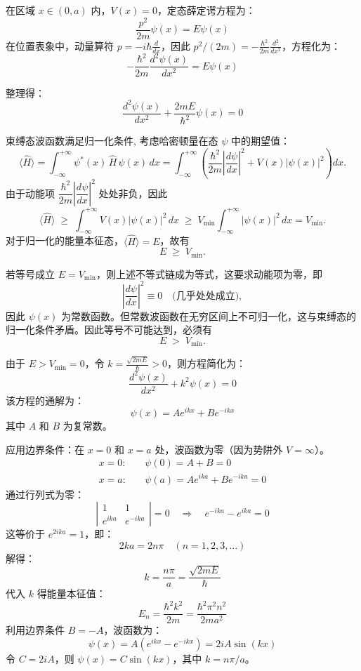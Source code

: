 在区域 $x \in (0, a)$ 内，$V(x) = 0$，定态薛定谔方程为：
\[
\frac{p^2}{2m} \psi(x) = E \psi(x)
\]
在位置表象中，动量算符 $p = -i\hbar \frac{d}{dx}$，因此 $p^2/(2m) = -\frac{\hbar^2}{2m} \frac{d^2}{dx^2}$，方程化为：
\[
-\frac{\hbar^2}{2m} \frac{d^2 \psi(x)}{dx^2} = E \psi(x)
\]

整理得：
\[
\frac{d^2 \psi(x)}{dx^2} + \frac{2mE}{\hbar^2} \psi(x) = 0
\]

\begin{center}
	\textit{	}
\end{center}
\begin{proofbox}
	束缚态波函数满足归一化条件, 考虑哈密顿量在态 $\psi$ 中的期望值：
	\[
	\langle \hat{H} \rangle = \int_{-\infty}^{+\infty} \psi^*(x) \, \hat{H} \, \psi(x) \, dx
	= \int_{-\infty}^{+\infty} \left( \frac{\hbar^2}{2m} \left| \frac{d\psi}{dx} \right|^2 + V(x) |\psi(x)|^2 \right) dx.
	\]
	由于动能项 $\dfrac{\hbar^2}{2m} \left| \dfrac{d\psi}{dx} \right|^2$ 处处非负，因此
	\[
	\langle \hat{H} \rangle \;\geq\; \int_{-\infty}^{+\infty} V(x) |\psi(x)|^2 \, dx
	\;\geq\; V_{\text{min}} \int_{-\infty}^{+\infty} |\psi(x)|^2 \, dx
	= V_{\text{min}} .
	\]
	对于归一化的能量本征态，$\langle \hat{H} \rangle = E$，故有
	\[
	E \;\geq\; V_{\text{min}} .
	\]
	
	若等号成立 $E = V_{\text{min}}$，则上述不等式链成为等式，这要求动能项为零，即
	\[
	\left| \frac{d\psi}{dx} \right|^2 \equiv 0 \quad \text{(几乎处处成立)},
	\]
	因此 $\psi(x)$ 为常数函数。但常数波函数在无穷区间上不可归一化，这与束缚态的归一化条件矛盾。因此等号不可能达到，必须有
	\[
	E \;>\; V_{\text{min}} .
	\]
\end{proofbox}	
由于 $E > V_{\min} = 0$，令 $\displaystyle k = \frac{\sqrt{2mE}}{\hbar}>0$，则方程简化为：
\[
\frac{d^2 \psi(x)}{dx^2} + k^2 \psi(x) = 0
\]
该方程的通解为：
\[
\psi(x) = A e^{ikx} + B e^{-ikx}
\]
其中 $A$ 和 $B$ 为复常数。

应用边界条件：在 $x=0$ 和 $x=a$ 处，波函数为零（因为势阱外 $V=\infty$）。
\begin{align*}
	x=0: &\quad \psi(0) = A + B = 0 \\
	x=a: &\quad \psi(a) = A e^{ika} + B e^{-ika} = 0
\end{align*}
通过行列式为零：
\[
\left| \begin{array}{cc}
	1 & 1 \\
	e^{ika} & e^{-ika}
\end{array} \right| = 0 \quad \Rightarrow \quad e^{-ika} - e^{ika} = 0
\]
这等价于 $e^{2ika} = 1$，即：
\[
2ka = 2n\pi \quad (n = 1, 2, 3, \dots)
\]
解得：
\[
k = \frac{n\pi}{a} = \frac{\sqrt{2mE}}{\hbar}
\]
代入 $k$ 得能量本征值：
\[
E_n = \frac{\hbar^2 k^2}{2m} = \frac{\hbar^2 \pi^2 n^2}{2m a^2}
\]
利用边界条件 $B = -A$，波函数为：
\[
\psi(x) = A (e^{ikx} - e^{-ikx}) = 2iA \sin(kx)
\]
令 $C = 2iA$，则 $\psi(x) = C \sin(kx)$，其中 $k = n\pi/a$。

